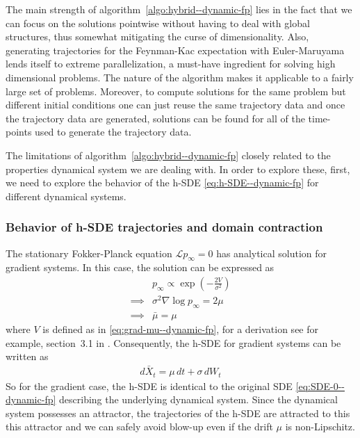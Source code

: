 
The main strength of algorithm~\ref{algo:hybrid--dynamic-fp} lies in the fact that we can focus on the solutions pointwise without having to deal with global structures, thus somewhat mitigating the curse of dimensionality. Also, generating trajectories for the Feynman-Kac expectation with Euler-Maruyama lends itself to extreme parallelization, a must-have ingredient for solving high dimensional problems. The nature of the algorithm makes it applicable to a fairly large set of problems. Moreover, to compute solutions for the same problem but different initial conditions one can just reuse the same trajectory data and once the trajectory data are generated, solutions can be found for all of the time-points used to generate the trajectory data.

The limitations of algorithm~\ref{algo:hybrid--dynamic-fp} closely related to the properties dynamical system we are dealing with. In order to explore these, first, we need to explore the behavior of the h-SDE \eqref{eq:h-SDE--dynamic-fp} for different dynamical systems.
\subsubsection{Behavior of h-SDE trajectories and domain contraction}\label{ssec-h-behavior--dynamic-fp}
The stationary Fokker-Planck equation $\mathcal Lp_\infty=0$ has analytical solution for gradient systems. In this case, the solution can be expressed as 
\begin{align}
    &p_\infty\propto \exp\left(-\frac{2V}{\sigma^2}\right)\\
    \implies&\sigma^2\nabla\log p_{\infty} = 2\mu\\
    \implies&\bar{\mu}=\mu
\end{align}
where $V$ is defined as in \eqref{eq:grad-mu--dynamic-fp}, for a derivation see for example, section~3.1 in \cite{mandal2023learning}. Consequently, the h-SDE for gradient systems can be written as 
\begin{align}
    d\bar X_t = \mu\, dt+\sigma\, dW_t\label{eq:h-SDE-grad--dynamic-fp}
\end{align}
So for the gradient case, the h-SDE is identical to the original SDE \eqref{eq:SDE-0--dynamic-fp} describing the underlying dynamical system. Since the dynamical system possesses an attractor, the trajectories of the h-SDE are attracted to this this attractor and we can safely avoid blow-up even if the drift $\mu$ is non-Lipschitz.

